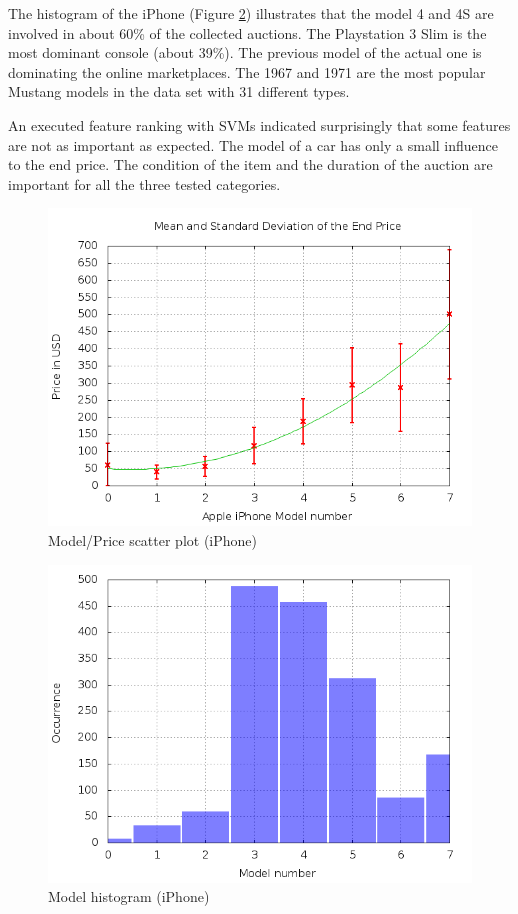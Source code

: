 The histogram of the iPhone (Figure \ref{model_hist_iphone}) illustrates that the model 4 and 4S are involved in about 60\% of the collected auctions. The Playstation 3 Slim is the most dominant console (about 39\%). The previous model of the actual one is dominating the online marketplaces. The 1967 and 1971 are the most popular Mustang models in the data set with 31 different types.

An executed feature ranking \cite{guyon} with SVMs indicated surprisingly that some features are not as important as expected. The model of a car has only a small influence to the end price. The condition of the item and the duration of the auction are important for all the three tested categories.
\begin{figure}
\centering
\includegraphics[scale=0.5]{images/plots/iphone/price_model_iphone.png}
\caption{Model/Price scatter plot (iPhone)}
\label{model_price_iphone}
\end{figure}
\begin{figure}
\centering
\includegraphics[scale=0.5]{images/plots/iphone/hist_model_iphone.png}
\caption{Model histogram (iPhone)}
\label{model_hist_iphone}
\end{figure}
